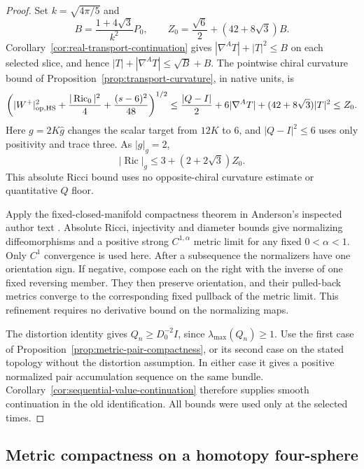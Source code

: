 \documentclass[11pt]{article}
\numberwithin{equation}{section}
\theoremstyle{definition}
\theoremstyle{remark}
\begin{document}
\begin{proof}
Set \(k=\sqrt{4\pi/5}\) and
\[
 B=\frac{1+4\sqrt3}{k^2}P_0,\qquad
 Z_0=\frac{\sqrt6}{2}+(42+8\sqrt3)B .
\]
Corollary~\ref{cor:real-transport-continuation} gives
\(|\nabla^AT|+|T|^2\le B\) on each selected slice,
and hence \(|T|+|\nabla^AT|\le\sqrt B+B\).
The pointwise chiral curvature bound of
Proposition~\ref{prop:transport-curvature}, in native
units, is
\[
 \left(|W^+|_{\rm op,HS}^2+
   \frac{|\operatorname{Ric}_0|^2}{4}
                  +\frac{(s-6)^2}{48}\right)^{1/2}
 \le\frac{|Q-I|}{2}
              +6|\nabla^AT|+(42+8\sqrt3)|T|^2
 \le Z_0 .
\]
Here \(g=2K\widehat g\) changes the scalar target
from \(12K\) to \(6\), and \(|Q-I|^2\le6\)
uses only positivity and trace three. As \(|g|_g=2\),
\[
 |\operatorname{Ric}|_g
                 \le3+(2+2\sqrt3)Z_0 .
\]
This absolute Ricci bound uses no opposite-chiral
curvature estimate or quantitative \(Q\) floor.

Apply the fixed-closed-manifold compactness theorem
in Anderson's inspected author text
\cite[Definition 1.1 and Theorem 2.2, (2.3)]{AndersonCheegerGromovAuthorSurvey}.
Absolute Ricci, injectivity and diameter bounds give
normalizing diffeomorphisms and a positive strong
\(C^{1,\alpha}\) metric limit for any fixed
\(0<\alpha<1\). Only \(C^1\) convergence is used here.
After a subsequence the normalizers have one
orientation sign. If negative, compose each on the
right with the inverse of one fixed reversing member.
They then preserve orientation, and their pulled-back metrics
converge to the corresponding fixed pullback of the metric limit.
This refinement requires no derivative bound on
the normalizing maps.

The distortion identity gives \(Q_n\ge D_0^{-2}I\),
since \(\lambda_{\max}(Q_n)\ge1\). Use the first case
of Proposition~\ref{prop:metric-pair-compactness},
or its second case on the stated topology without
the distortion assumption. In either case it gives
a positive normalized pair accumulation sequence
on the same bundle. Corollary~\ref{cor:sequential-value-continuation}
therefore supplies smooth continuation in the old
identification. All bounds were used only at the
selected times.
\end{proof}


\subsection{Metric compactness on a homotopy four-sphere}
\label{subsec:homotopy-metric-compactness}
\end{document}
